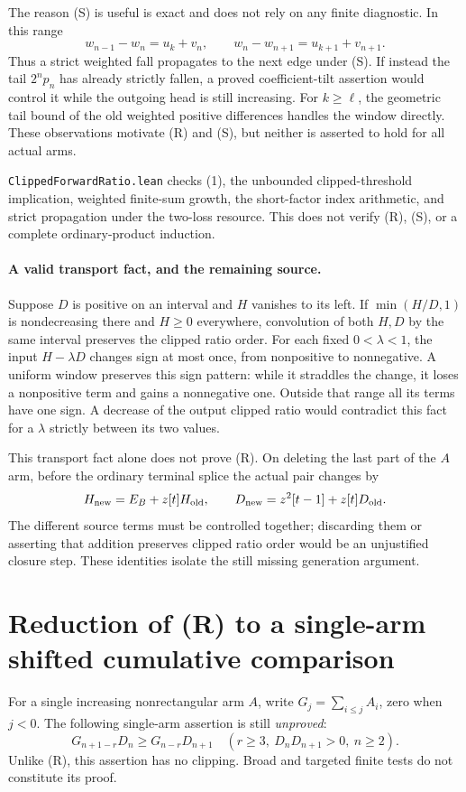 The reason (S) is useful is exact and does not rely on any
finite diagnostic. In this range
\[
 w_{n-1}-w_n=u_k+v_n,\qquad
 w_n-w_{n+1}=u_{k+1}+v_{n+1}.
\]
Thus a strict weighted fall propagates to the next edge
under (S). If instead the tail $2^n p_n$ has already
strictly fallen, a proved coefficient-tilt assertion would
control it while the outgoing head is still increasing.
For $k\ge\ell$, the geometric tail bound of the old
weighted positive differences handles the window directly.
These observations motivate (R) and (S), but neither is
asserted to hold for all actual arms.

\texttt{ClippedForwardRatio.lean} checks (1), the unbounded
clipped-threshold implication, weighted finite-sum growth,
the short-factor index arithmetic, and strict propagation
under the two-loss resource. This does not verify (R),
(S), or a complete ordinary-product induction.

\paragraph{A valid transport fact, and the remaining source.}
Suppose $D$ is positive on an interval and $H$ vanishes to
its left. If $\min(H/D,1)$ is nondecreasing there and
$H\ge0$ everywhere, convolution of both $H,D$ by the same
interval preserves the clipped ratio order. For each fixed
$0<\lambda<1$, the input $H-\lambda D$ changes sign at
most once, from nonpositive to nonnegative. A uniform window
preserves this sign pattern: while it straddles the change,
it loses a nonpositive term and gains a nonnegative one.
Outside that range all its terms have one sign. A decrease
of the output clipped ratio would contradict this fact for
a $\lambda$ strictly between its two values.

This transport fact alone does not prove (R). On deleting
the last part of the $A$ arm, before the ordinary terminal
splice the actual pair changes by
\[
 H_{\rm new}=E_B+z[t]H_{\rm old},\qquad
 D_{\rm new}=z^2[t-1]+z[t]D_{\rm old}.
\]
The different source terms must be controlled together;
discarding them or asserting that addition preserves clipped
ratio order would be an unjustified closure step. These
identities isolate the still missing generation argument.

\section{Reduction of (R) to a single-arm shifted cumulative comparison}
For a single increasing nonrectangular arm $A$, write
$G_j=\sum_{i\le j}A_i$, zero when $j<0$. The following
single-arm assertion is still \emph{unproved}:
\[
 G_{n+1-r}D_n\ge G_{n-r}D_{n+1}
 \quad\left(r\ge3,\ D_nD_{n+1}>0,\ n\ge2\right).
                                                        \tag{C}
\]
Unlike (R), this assertion has no clipping. Broad and targeted
finite tests do not constitute its proof.

